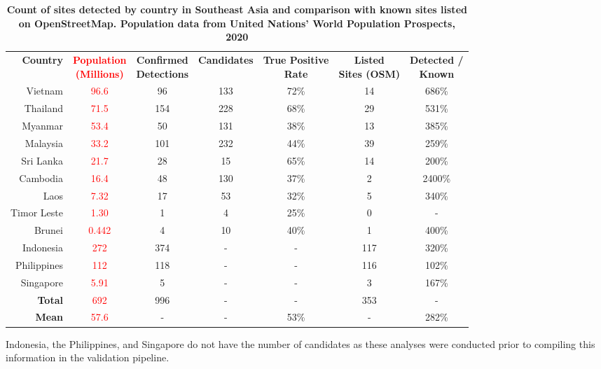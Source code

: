 \documentclass[10pt,letterpaper]{article}
\begin{document}
\begin{table}[!ht]
    \begin{adjustwidth}{-2.25in}{0in}
    \caption{\textbf{ Count of sites detected by country in Southeast Asia and comparison with known sites listed on OpenStreetMap. Population data from United Nations’ World Population Prospects, 2020}}
    \label{table:se_asia_stats}
    \begin{tabular}{rcccccc}
    \toprule
    \textbf{Country} & \specialcell{\textbf{\textcolor{red}{Population}}\\\textbf{\textcolor{red}{(Millions)}}} & \specialcellc{\textbf{Confirmed}\\\textbf{Detections}} & \textbf{Candidates} & \specialcellc{\textbf{True Positive}\\\textbf{Rate}} & \specialcellc{\textbf{Listed}\\\textbf{Sites (OSM)}} & \specialcellc{\textbf{Detected /}\\\textbf{Known}}  \\
    Vietnam     & \textcolor{red}{96.6}  & 96    & 133   & 72\%  & 14    & 686\%  \\
    Thailand    & \textcolor{red}{71.5}  & 154   & 228   & 68\%  & 29    & 531\%  \\
    Myanmar     & \textcolor{red}{53.4}  & 50    & 131   & 38\%  & 13    & 385\%  \\
    Malaysia    & \textcolor{red}{33.2}  & 101   & 232   & 44\%  & 39    & 259\%  \\
    Sri Lanka   & \textcolor{red}{21.7}  & 28    & 15    & 65\%  & 14    & 200\%  \\
    Cambodia    & \textcolor{red}{16.4}  & 48    & 130   & 37\%  & 2     & 2400\% \\
    Laos        & \textcolor{red}{7.32}  & 17    & 53    & 32\%  & 5     & 340\%  \\
    Timor Leste & \textcolor{red}{1.30}  & 1     & 4     & 25\%  & 0     & -      \\
    Brunei      & \textcolor{red}{0.442} & 4     & 10    & 40\%  & 1     & 400\%  \\
    Indonesia   & \textcolor{red}{272}   & 374   & -     & -     & 117   & 320\%  \\
    Philippines & \textcolor{red}{112}   & 118   & -     & -     & 116   & 102\%  \\
    Singapore   & \textcolor{red}{5.91}  & 5     & -     & -     & 3     & 167\%  \\
    \midrule
    \textbf{Total}  & \textcolor{red}{692}   &  996 & -  & -     & 353   & -     \\
    \textbf{Mean}   & \textcolor{red}{57.6}  &  -   & -  & 53\%  & -     & 282\% \\
    \bottomrule
    \end{tabular}
    \begin{flushleft} Indonesia, the Philippines, and Singapore do not have the number of candidates as these analyses were conducted prior to compiling this information in the validation pipeline.
    \end{flushleft}
    \end{adjustwidth}
\end{table}
\end{document}

